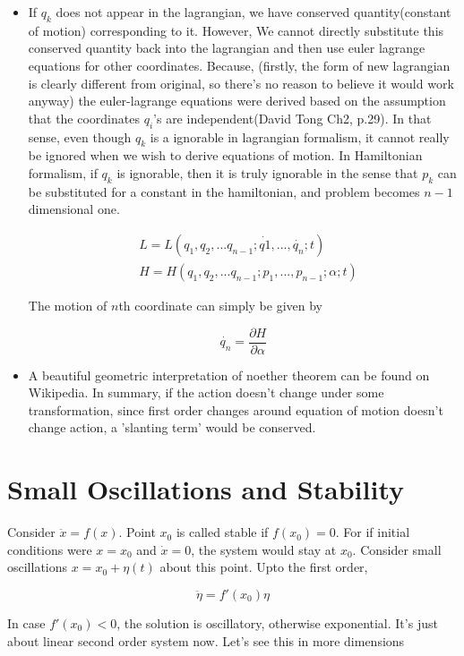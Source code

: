 \documentclass{report}
\begin{document}
\begin{itemize}
  \item If $q_k$ does not appear in the lagrangian, we have conserved quantity(constant of motion) corresponding to it. However, We cannot directly substitute this conserved quantity back into the lagrangian and then use euler lagrange equations for other coordinates. Because, (firstly, the form of new lagrangian is clearly different from original, so there's no reason to believe it would work anyway) the euler-lagrange equations were derived based on the assumption that the coordinates $q_i$'s are independent(David Tong Ch2, p.29). In that sense, even though $q_k$ is a ignorable in lagrangian formalism, it cannot really be ignored when we wish to derive equations of motion. In Hamiltonian formalism, if $q_k$ is ignorable, then it is truly ignorable in the sense that $p_k$ can be substituted for a constant in the hamiltonian, and problem becomes $n-1$ dimensional one.

\begin{align}
&L = L(q_1,q_2,...q_{n-1};\dot{q1},...,\dot{q_n};t)\\
&H = H(q_1,q_2,...q_{n-1}; p_1,...,p_{n-1};\alpha;t)
\end{align}

The motion of $n$th coordinate can simply be given by 

$$\dot{q_n} = \frac{\partial H}{\partial\alpha}$$

  \item A beautiful geometric interpretation of noether theorem can be found on Wikipedia. In summary, if the action doesn't change under some transformation, since first order changes around equation of motion doesn't change action, a 'slanting term' would be conserved.
\end{itemize}

\section{Small Oscillations and Stability}

Consider $\ddot{x} = f(x)$. Point $x_0$ is called stable if $f(x_0) = 0$. For if initial conditions were $x=x_0$ and $\dot{x} = 0$, the system would stay at $x_0$. Consider small oscillations $x = x_0 + \eta(t)$ about this point. Upto the first order, 

$$\ddot{\eta} = f'(x_0)\eta$$

\noindent In case $f'(x_0) < 0$, the solution is oscillatory, otherwise exponential. It's just about linear second order system now. Let's see this in more dimensions
\end{document}
